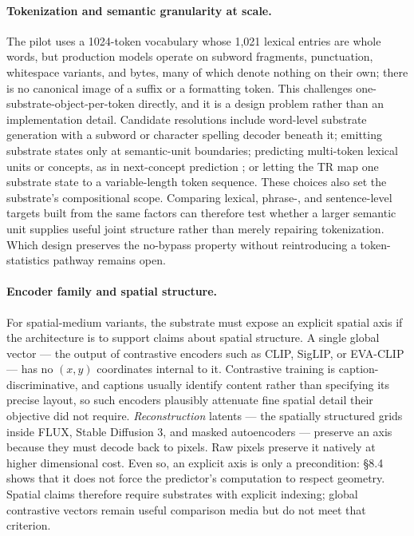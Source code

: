 \documentclass[11pt,a4paper]{article}
\begin{document}
\paragraph{Tokenization and semantic granularity at scale.} The pilot uses a 1024-token vocabulary whose 1,021 lexical entries are whole words, but production models operate on subword fragments, punctuation, whitespace variants, and bytes, many of which denote nothing on their own; there is no canonical image of a suffix or a formatting token. This challenges one-substrate-object-per-token directly, and it is a design problem rather than an implementation detail. Candidate resolutions include word-level substrate generation with a subword or character spelling decoder beneath it; emitting substrate states only at semantic-unit boundaries; predicting multi-token lexical units or concepts, as in next-concept prediction \cite{nextconcept2026}; or letting the TR map one substrate state to a variable-length token sequence. These choices also set the substrate's compositional scope. Comparing lexical, phrase-, and sentence-level targets built from the same factors can therefore test whether a larger semantic unit supplies useful joint structure rather than merely repairing tokenization. Which design preserves the no-bypass property without reintroducing a token-statistics pathway remains open.

\paragraph{Encoder family and spatial structure.} For spatial-medium variants, the substrate must expose an explicit spatial axis if the architecture is to support claims about spatial structure. A single global vector --- the output of contrastive encoders such as CLIP, SigLIP, or EVA-CLIP --- has no $(x,y)$ coordinates internal to it. Contrastive training is caption-discriminative, and captions usually identify content rather than specifying its precise layout, so such encoders plausibly attenuate fine spatial detail their objective did not require. \emph{Reconstruction} latents --- the spatially structured grids inside FLUX, Stable Diffusion 3, and masked autoencoders --- preserve an axis because they must decode back to pixels. Raw pixels preserve it natively at higher dimensional cost. Even so, an explicit axis is only a precondition: §8.4 shows that it does not force the predictor's computation to respect geometry. Spatial claims therefore require substrates with explicit indexing; global contrastive vectors remain useful comparison media but do not meet that criterion.
\end{document}
